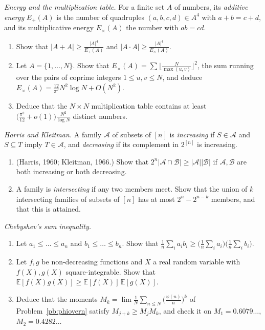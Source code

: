 \begin{exercise}[$\star\star$]\label{pb:energy}
\emph{Energy and the multiplication table.} For a finite set $A$ of numbers, its \emph{additive energy} $E_+(A)$ is the number of
quadruples $(a,b,c,d)\in A^4$ with $a+b=c+d$, and its multiplicative energy $E_\times(A)$ the number with $ab=cd$.
\begin{enumerate}[label=(\alph*)]
\item Show that $|A+A|\ge\frac{|A|^4}{E_+(A)}$ and $|A\cdot A|\ge\frac{|A|^4}{E_\times(A)}$.
\item Let $A=\{1,\dots,N\}$. Show that $E_\times(A)=\sum\bigl\lfloor\frac N{\max(u,v)}\bigr\rfloor^2$, the sum running over the pairs of coprime
integers $1\le u,v\le N$, and deduce $E_\times(A)=\frac{12}{\pi^2}N^2\log N+O(N^2)$.
\item Deduce that the $N\times N$ multiplication table contains at least $\bigl(\frac{\pi^2}{12}+o(1)\bigr)\frac{N^2}{\log N}$ distinct numbers.
\end{enumerate}
\end{exercise}

\begin{exercise}[$\star\star$]\label{pb:kleitman}
\emph{Harris and Kleitman.} A family $\mathcal A$ of subsets of $[n]$ is \emph{increasing} if $S\in\mathcal A$ and $S\subseteq T$ imply $T\in\mathcal A$,
and \emph{decreasing} if its complement in $2^{[n]}$ is increasing.
\begin{enumerate}[label=(\alph*)]
\item (Harris, 1960; Kleitman, 1966.) Show that $2^n|\mathcal A\cap\mathcal B|\ge|\mathcal A||\mathcal B|$ if $\mathcal A,\mathcal B$ are both increasing or both decreasing.
\item A family is \emph{intersecting} if any two members meet. Show that the union of $k$ intersecting families of subsets of $[n]$ has
at most $2^n-2^{n-k}$ members, and that this is attained.
\end{enumerate}
\end{exercise}

\begin{exercise}[$\star$]\label{pb:chebyshevsum}
\emph{Chebyshev's sum inequality.}
\begin{enumerate}[label=(\alph*)]
\item Let $a_1\le\dots\le a_n$ and $b_1\le\dots\le b_n$. Show that $\frac1n\sum_ia_ib_i\ge\bigl(\frac1n\sum_ia_i\bigr)\bigl(\frac1n\sum_ib_i\bigr)$.
\item Let $f,g$ be non-decreasing functions and $X$ a real random variable with $f(X),g(X)$ square-integrable. Show that
$\mathbb E[f(X)g(X)]\ge\mathbb E[f(X)]\,\mathbb E[g(X)]$.
\item Deduce that the moments $M_k=\lim\frac1N\sum_{n\le N}\bigl(\frac{\varphi(n)}n\bigr)^k$ of Problem~\ref{pb:phiovern} satisfy
$M_{j+k}\ge M_jM_k$, and check it on $M_1=0.6079\ldots$, $M_2=0.4282\ldots$
\end{enumerate}
\end{exercise}

